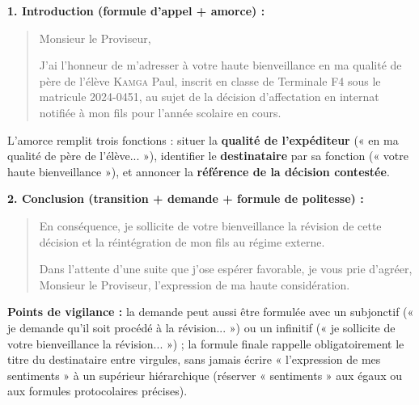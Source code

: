 \documentclass[11pt]{article}
\begin{document}
\begin{corrige}
\textbf{1. Introduction (formule d'appel + amorce) :}
\begin{quote}
Monsieur le Proviseur,

J'ai l'honneur de m'adresser à votre haute bienveillance en ma qualité de père de l'élève \textsc{Kamga} Paul, inscrit en classe de Terminale F4 sous le matricule 2024-0451, au sujet de la décision d'affectation en internat notifiée à mon fils pour l'année scolaire en cours.
\end{quote}
L'amorce remplit trois fonctions : situer la \textbf{qualité de l'expéditeur} (« en ma qualité de père de l'élève... »), identifier le \textbf{destinataire} par sa fonction (« votre haute bienveillance »), et annoncer la \textbf{référence de la décision contestée}.
\par\textbf{2. Conclusion (transition + demande + formule de politesse) :}
\begin{quote}
En conséquence, je sollicite de votre bienveillance la révision de cette décision et la réintégration de mon fils au régime externe.

Dans l'attente d'une suite que j'ose espérer favorable, je vous prie d'agréer, Monsieur le Proviseur, l'expression de ma haute considération.
\end{quote}
\textbf{Points de vigilance :} la demande peut aussi être formulée avec un subjonctif (« je demande qu'il soit procédé à la révision... ») ou un infinitif (« je sollicite de votre bienveillance la révision... ») ; la formule finale rappelle obligatoirement le titre du destinataire entre virgules, sans jamais écrire « l'expression de mes sentiments » à un supérieur hiérarchique (réserver « sentiments » aux égaux ou aux formules protocolaires précises).
\end{corrige}
\end{document}
